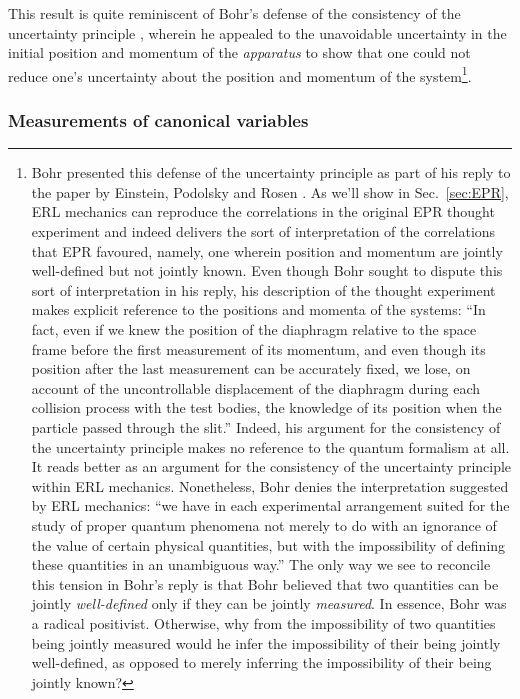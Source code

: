 \documentclass[pra,superscriptaddress,nofootinbib,12pt]{revtex4-2}
\begin{document}
This result is quite reminiscent of Bohr's defense of the consistency of the uncertainty principle \cite{BohrReplytoEPR}, wherein he appealed to the unavoidable uncertainty in the initial position and momentum of the \emph{apparatus} to show that one could not reduce one's uncertainty about the position and momentum of the system\footnote{Bohr presented this defense of the uncertainty principle as part of his reply to the paper by Einstein, Podolsky and Rosen \cite{EPR35}. As we'll show in Sec.~\ref{sec:EPR}, ERL mechanics can reproduce the correlations in the original EPR thought experiment and indeed delivers the sort of interpretation of the correlations that EPR favoured, namely, one wherein position and momentum are jointly well-defined but not jointly known.  Even though Bohr sought to dispute this sort of interpretation in his reply, his description of the thought experiment makes explicit reference to the positions and momenta of the systems: ``In fact, even if we knew the position of the diaphragm relative to the space frame before the first measurement of its momentum, and even though its position after the last measurement can be accurately fixed, we lose, on account of the uncontrollable displacement of the diaphragm during each collision process with the test bodies, the knowledge of its position when the particle passed through the slit.''  Indeed, his argument for the consistency of the uncertainty principle makes no reference to the quantum formalism at all.  It reads better as an argument for the consistency of the uncertainty principle within ERL mechanics.  Nonetheless, Bohr denies the interpretation suggested by ERL mechanics: ``we have in each experimental arrangement suited for the study of proper quantum phenomena not merely to do with an ignorance of the value of certain physical quantities, but with the impossibility of defining these quantities in an unambiguous way.''  The only way we see to reconcile this tension in Bohr's reply is that Bohr believed that two quantities can be jointly \emph{well-defined} only if they can be jointly \emph{measured}.  In essence, Bohr was a radical positivist. Otherwise, why from the impossibility of two quantities being  jointly measured would he infer the impossibility of their being jointly well-defined, as opposed to merely inferring the impossibility of their being jointly known?}.


\subsubsection{Measurements of canonical variables}
\label{sec:SharpMmts}
\end{document}
